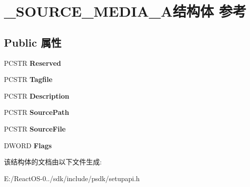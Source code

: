 \hypertarget{struct___s_o_u_r_c_e___m_e_d_i_a___a}{}\section{\+\_\+\+S\+O\+U\+R\+C\+E\+\_\+\+M\+E\+D\+I\+A\+\_\+\+A结构体 参考}
\label{struct___s_o_u_r_c_e___m_e_d_i_a___a}
\subsection*{Public 属性}
\begin{DoxyCompactItemize}
\item 
\mbox{\label{struct___s_o_u_r_c_e___m_e_d_i_a___a_aeafe88d1a394ebc57950823f3301befb}} 
P\+C\+S\+TR {\bfseries Reserved}
\item 
\mbox{\label{struct___s_o_u_r_c_e___m_e_d_i_a___a_ad262c4e25b0f6e9d277fa22a8a71fc69}} 
P\+C\+S\+TR {\bfseries Tagfile}
\item 
\mbox{\label{struct___s_o_u_r_c_e___m_e_d_i_a___a_a4b458f903a1932e0dd0f6afb81bd47b8}} 
P\+C\+S\+TR {\bfseries Description}
\item 
\mbox{\label{struct___s_o_u_r_c_e___m_e_d_i_a___a_a8a6e81956018cb73b62cd2864b08974f}} 
P\+C\+S\+TR {\bfseries Source\+Path}
\item 
\mbox{\label{struct___s_o_u_r_c_e___m_e_d_i_a___a_ac0d140e7ea30c0d151a35a4234db9009}} 
P\+C\+S\+TR {\bfseries Source\+File}
\item 
\mbox{\label{struct___s_o_u_r_c_e___m_e_d_i_a___a_a703430edc4b08938fc38d07bf1ad2a52}} 
D\+W\+O\+RD {\bfseries Flags}
\end{DoxyCompactItemize}


该结构体的文档由以下文件生成\+:\begin{DoxyCompactItemize}
\item 
E\+:/\+React\+O\+S-\/0../sdk/include/psdk/setupapi.\+h\end{DoxyCompactItemize}
